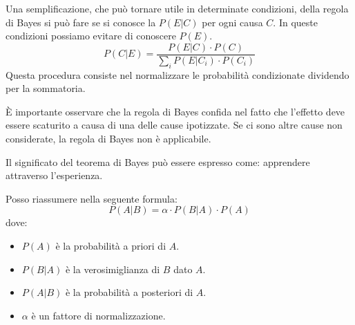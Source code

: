 Una semplificazione, che può tornare utile in determinate condizioni, della
regola di Bayes si può fare se si conosce la $P(E|C)$ per ogni causa $C$. In
queste condizioni possiamo evitare di conoscere $P(E)$.
\begin{equation}
    P(C|E) = \frac{P(E|C) \cdot P(C)}{\sum_{i} P(E|C_i) \cdot P(C_i)}
\end{equation}
Questa procedura consiste nel normalizzare le probabilità condizionate dividendo
per la sommatoria.
\begin{nota}
    È importante osservare che la regola di Bayes confida nel fatto che l'effetto
    deve essere scaturito a causa di una delle cause ipotizzate. Se ci sono altre
    cause non considerate, la regola di Bayes non è applicabile.
\end{nota}
Il significato del teorema di Bayes può essere espresso come: apprendere
attraverso l'esperienza.

Posso riassumere nella seguente formula:
\begin{equation}
    P(A|B) = \alpha \cdot P(B | A) \cdot P(A)
\end{equation}
dove:
\begin{itemize}
    \item $P(A)$ è la probabilità a priori di $A$.
    \item $P(B|A)$ è la verosimiglianza di $B$ dato $A$.
    \item $P(A|B)$ è la probabilità a posteriori di $A$.
    \item $\alpha$ è un fattore di normalizzazione.
\end{itemize}

